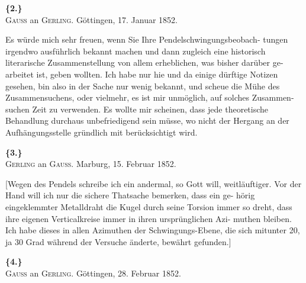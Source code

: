 \documentclass[12pt,a4paper]{article}
\theoremstyle{plain}
\theoremstyle{definition}
\theoremstyle{remark}
\begin{document}
\vspace{0.5cm}

\noindent\textbf{\{2.\}}\\
\textsc{Gauss} an \textsc{Gerling}. G\"ottingen, 17. Januar 1852.

\vspace{0.3cm}

Es w\"urde mich sehr freuen, wenn Sie Ihre Pendelschwingungsbeobach-
tungen irgendwo ausf\"uhrlich bekannt machen und dann zugleich eine historisch
literarische Zusammenstellung von allem erheblichen, was bisher dar\"uber ge-
arbeitet ist, geben wollten. Ich habe nur hie und da einige d\"urftige Notizen
gesehen, bin also in der Sache nur wenig bekannt, und scheue die M\"uhe des
Zusammensuchens, oder vielmehr, es ist mir unm\"oglich, auf solches Zusammen-
suchen Zeit zu verwenden. Es wollte mir scheinen, dass jede theoretische
Behandlung durchaus unbefriedigend sein m\"usse, wo nicht der Hergang an
der Aufh\"angungsstelle gr\"undlich mit ber\"ucksichtigt wird.

\vspace{0.5cm}

\noindent\textbf{\{3.\}}\\
\textsc{Gerling} an \textsc{Gauss}. Marburg, 15. Februar 1852.

\vspace{0.3cm}

[Wegen des Pendels schreibe ich ein andermal, so Gott will, weitl\"auftiger.
Vor der Hand will ich nur die sichere Thatsache bemerken, dass ein ge-
h\"orig eingeklemmter Metalldraht die Kugel durch seine Torsion immer so
dreht, dass ihre eigenen Verticalkreise immer in ihren urspr\"unglichen Azi-
muthen bleiben. Ich habe dieses in allen Azimuthen der Schwingungs-Ebene,
die sich mitunter 20, ja 30 Grad w\"ahrend der Versuche \"anderte, bew\"ahrt
gefunden.]

\vspace{0.5cm}

\noindent\textbf{\{4.\}}\\
\textsc{Gauss} an \textsc{Gerling}. G\"ottingen, 28. Februar 1852.

\vspace{0.3cm}
\end{document}
